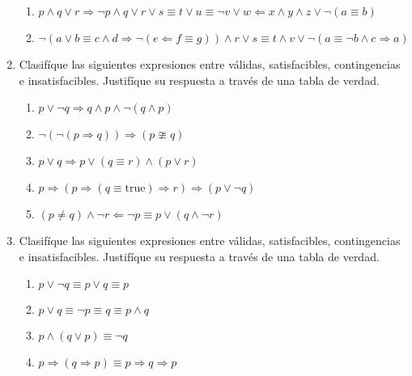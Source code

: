 \documentclass{article}
\begin{document}
\begin{enumerate}
\begin{enumerate}
		\item $p \land q \lor r \Rightarrow \neg p \land q \lor r \lor s \equiv t \lor u \equiv \neg v \lor w \Leftarrow x \land y \land z \lor \neg(a \equiv b)$
		
		\item $\neg(a \lor b \equiv c \land d \Rightarrow \neg(e \Leftarrow f \equiv g)) \land r \lor s \equiv t \land v \lor \neg(a \equiv \neg b \land c \Rightarrow a)$
		
	\end{enumerate}

	\item Clasifíque las siguientes expresiones entre válidas, satisfacibles, contingencias e insatisfacibles.
	Justifíque su respuesta a través de una tabla de verdad.

	\begin{enumerate}
		\item $p \lor \neg q \Rightarrow q \land p \land \neg(q \land p)$

		\item $\neg(\neg(p \Rightarrow q)) \Rightarrow (p \ncong q)$

		\item $p \lor q \Rightarrow p \lor (q \equiv r) \land (p \lor r)$

		\item $p \Rightarrow (p \Rightarrow (q \equiv \text{true}) \Rightarrow r) \Rightarrow (p \lor \neg q)$

		\item $(p \neq q) \land \neg r \Leftarrow \neg p \equiv p \lor (q \land \neg r)$
	\end{enumerate}

	\item Clasifíque las siguientes expresiones entre válidas, satisfacibles, contingencias e insatisfacibles.
	Justifíque su respuesta a través de una tabla de verdad.

	\begin{enumerate}
		\item $p \lor \neg q \equiv p \lor q \equiv p$

		\item $p \lor q \equiv \neg p \equiv q \equiv p \land q$

		\item $p \land (q \lor p) \equiv \neg q$

		\item $p \Rightarrow (q \Rightarrow p) \equiv p \Rightarrow q \Rightarrow p$ 
	\end{enumerate}


\end{enumerate}
\end{document}
